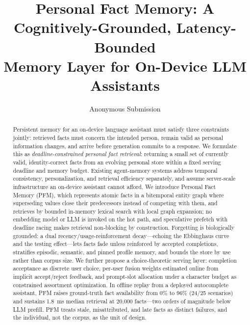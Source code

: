 \documentclass[letterpaper]{article}
\title{Personal Fact Memory: A Cognitively-Grounded, Latency-Bounded\\
       Memory Layer for On-Device LLM Assistants}
\author{
    Anonymous Submission
}
\begin{document}
\maketitle

\begin{abstract}
Persistent memory for an on-device language assistant must satisfy three
constraints jointly: retrieved facts must concern the intended person, remain
valid as personal information changes, and arrive before generation commits
to a response. We formulate this as \emph{deadline-constrained personal fact
retrieval}: returning a small set of currently valid, identity-correct facts
from an evolving personal store within a fixed serving deadline and memory
budget. Existing agent-memory systems address temporal consistency,
personalization, and retrieval efficiency separately, and assume server-scale
infrastructure an on-device assistant cannot afford. We
introduce Personal Fact Memory (PFM), which represents atomic facts in a
bitemporal entity graph where superseding values close their predecessors
instead of competing with them, and retrieves by bounded in-memory lexical
search with local graph expansion; no embedding model or LLM is invoked on
the hot path, and speculative prefetch with deadline racing makes retrieval
non-blocking by construction. Forgetting is biologically grounded: a dual
recency/usage-reinforcement decay---echoing the Ebbinghaus curve and the
testing effect---lets facts fade unless reinforced by accepted completions,
stratifies episodic, semantic, and pinned profile memory, and bounds the
store by use rather than corpus size. We further propose a choice-theoretic
serving layer: completion acceptance as discrete user choice, per-user fusion
weights estimated online from implicit accept/reject feedback, and
prompt-slot allocation under a character budget as constrained assortment
optimization. In offline replay from a deployed autocomplete assistant, PFM
raises ground-truth fact availability from 0\% to 96\% (24/25 scenarios) and
sustains 1.8~ms median retrieval at 20{,}000 facts---two orders of magnitude
below LLM prefill. PFM treats stale, misattributed, and late facts as
distinct failures, and the individual, not the corpus, as the unit of design.
\end{abstract}

\end{document}
